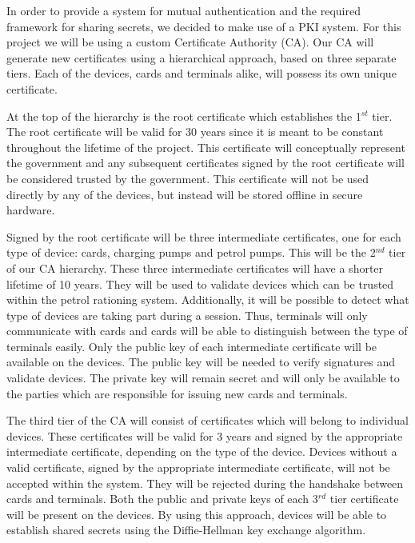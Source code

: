 In order to provide a system for mutual authentication and the required framework for sharing secrets, we decided to make use of a PKI system. For this project we will be using a custom Certificate Authority (CA). Our CA will generate new certificates using a hierarchical approach, based on three separate tiers. Each of the devices, cards and terminals alike, will possess its own unique certificate.

At the top of the hierarchy is the root certificate which establishes the 1$^{st}$ tier. The root certificate will be valid for 30 years since it is meant to be constant throughout the lifetime of the project. This certificate will conceptually represent the government and any subsequent certificates signed by the root certificate will be considered trusted by the government. This certificate will not be used directly by any of the devices, but instead will be stored offline in secure hardware.

Signed by the root certificate will be three intermediate certificates, one for each type of device: cards, charging pumps and petrol pumps. This will be the 2$^{nd}$ tier of our CA hierarchy. These three intermediate certificates will have a shorter lifetime of 10 years. They will be used to validate devices which can be trusted within the petrol rationing system. Additionally, it will be possible to detect what type of devices are taking part during a session. Thus, terminals will only communicate with cards and cards will be able to distinguish between the type of terminals easily. Only the public key of each intermediate certificate will be available on the devices. The public key will be needed to verify signatures and validate devices. The private key will remain secret and will only be available to the parties which are responsible for issuing new cards and terminals.

The third tier of the CA will consist of certificates which will belong to individual devices. These certificates will be valid for 3 years and signed by the appropriate intermediate certificate, depending on the type of the device. Devices without a valid certificate, signed by the appropriate intermediate certificate, will not be accepted within the system. They will be rejected during the handshake between cards and terminals. Both the public and private keys of each 3$^{rd}$ tier certificate will be present on the devices. By using this approach, devices will be able to establish shared secrets using the Diffie-Hellman key exchange algorithm.